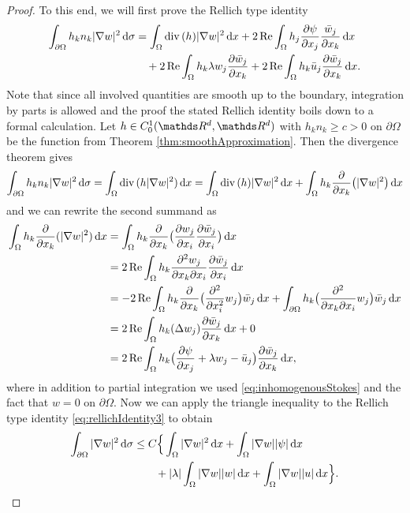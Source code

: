 \begin{proof}
  To this end, we will first prove the Rellich type identity
  \begin{align}
    \int_{\partial\Omega} h_k n_k |\nabla w|^2 \, {\operatorname{d}\!{\sigma}}
    &= \int_\Omega \mathrm{div\,} (h) |\nabla w|^2 \, {\operatorname{d}\!{x}} + 2 \operatorname{Re} \int_{\Omega} h_j \frac{\partial \psi}{\partial x_j} \frac{\bar w_j}{\partial x_k}\, {\operatorname{d}\!{x}}  \nonumber \\
    &\quad + 2 \operatorname{Re} \int_\Omega h_k \lambda w_j \frac{\partial\bar w_j}{\partial x_k} + 2 \operatorname{Re} \int_\Omega h_k \bar u_j \frac{\partial \bar w_j}{\partial x_k} \, {\operatorname{d}\!{x}}. \label{eq:rellichIdentity3}
  \end{align} 
  Note that since all involved quantities are smooth up to the boundary, integration by parts is allowed and the proof the stated  Rellich identity boils down to a formal calculation.
  Let $h \in C_0^1(\R^d, \R^d)$ with $h_k n_k \geq c > 0$ on $\partial \Omega$ be the function from Theorem \ref{thm:smoothApproximation}.
  Then the divergence theorem gives
  \begin{align*}
    \int_{\partial\Omega} h_k n_k |\nabla w|^2 \, {\operatorname{d}\!{\sigma}}
    = \int_{\Omega} \mathrm{div\,} (h |\nabla w|^2) \, {\operatorname{d}\!{x}} = \int_\Omega \mathrm{div\,} (h) |\nabla w|^2 \, {\operatorname{d}\!{x}} + \int_\Omega h_k \frac{\partial}{\partial x_k} \big( |\nabla w|^2 \big) \, {\operatorname{d}\!{x}}
  \end{align*}
  and we can rewrite the second summand as
  \begin{align*}
    \int_{\Omega} h_k \frac{\partial}{\partial x_k} (|\nabla w|^2) \, {\operatorname{d}\!{x}}
    &= \int_{\Omega} h_k \frac{\partial}{\partial x_k} \big( \frac{\partial w_j}{\partial x_i} \frac{\partial \bar w_j}{\partial x_i}\big) \, {\operatorname{d}\!{x}} \\
    &= 2 \operatorname{Re} \int_\Omega h_k \frac{\partial^2 w_j}{\partial x_k \partial x_i} \frac{\partial \bar w_j}{\partial x_i} \, {\operatorname{d}\!{x}} \\
    &= - 2 \operatorname{Re} \int_\Omega h_k \frac{\partial}{\partial x_k} \big( \frac{\partial^2}{\partial x_i^2} w_j \big) \bar w_j \, {\operatorname{d}\!{x}} + \int_{\partial\Omega} h_k \big( \frac{\partial^2}{\partial x_k \partial x_i} w_j \big) \bar w_j \, {\operatorname{d}\!{x}}\\
    &= 2 \operatorname{Re} \int_\Omega h_k ( \Delta w_j ) \frac{\partial \bar w_j}{\partial x_k} \, {\operatorname{d}\!{x}} + 0 \\
    &= 2 \operatorname{Re} \int_\Omega h_k \big( \frac{\partial \psi}{\partial x_j} + \lambda w_j - \bar u_j \big) \frac{\partial \bar w_j}{\partial x_k} \, {\operatorname{d}\!{x}},
  \end{align*}
  where in addition to partial integration we used \eqref{eq:inhomogenousStokes} and the fact that $w = 0$ on $\partial\Omega$.
  Now we can apply the triangle inequality to the Rellich type identity \eqref{eq:rellichIdentity3} to obtain
  \begin{align}
    \int_{\partial\Omega} |\nabla w|^2 \, {\operatorname{d}\!{\sigma}} 
    &\leq C \Big\{ \int_\Omega |\nabla w|^2 \, {\operatorname{d}\!{x}} + \int_\Omega |\nabla w | |\psi| \, {\operatorname{d}\!{x}} \nonumber\\
    &\qquad + |\lambda| \int_\Omega |\nabla w| |w| \, {\operatorname{d}\!{x}} + \int_\Omega |\nabla w| |u| \, {\operatorname{d}\!{x}} \Big\}. \label{eq:rellichInequality3}
  \end{align}


\end{proof}
